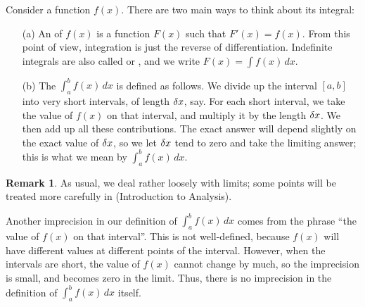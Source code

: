 \documentclass[a4paper]{book}
\theoremstyle{definition}
\newtheorem{remark}[theorem]{Remark}
\begin{document}
Consider a function $f(x)$.  There are two main ways to think about
its integral:
\begin{itemize}
 \item[(a)] An  of $f(x)$ is a function
  $F(x)$ such that $F'(x)=f(x)$.  From this point of view, integration
  is just the reverse of differentiation.  Indefinite integrals are
  also called  or , and we
  write $F(x)=\int f(x)\,dx$.
 \item[(b)] The  $\int_a^bf(x)\,dx$ is defined
  as follows.  We divide up the interval $[a,b]$ into very short
  intervals, of length $\delta x$, say.  For each short interval, we take
  the value of $f(x)$ on that interval, and multiply it by the length
  $\delta x$.  We then add up all these contributions.  The exact answer
  will depend slightly on the exact value of $\delta x$, so we let
  $\delta x$ tend to zero and take the limiting answer; this is what we
  mean by $\int_a^bf(x)\, dx$.
\end{itemize}
\begin{remark}
 As usual, we deal rather loosely with limits; some points will be
 treated more carefully in  (Introduction to Analysis).

 Another imprecision in our definition of $\int_a^bf(x)\,dx$ comes
 from the phrase ``the value of $f(x)$ on that interval''.  This is
 not well-defined, because $f(x)$ will have different values at
 different points of the interval.  However, when the intervals are
 short, the value of $f(x)$ cannot change by much, so the imprecision
 is small, and becomes zero in the limit.  Thus, there is no
 imprecision in the definition of $\int_a^bf(x)\,dx$ itself.
\end{remark}
\end{document}
